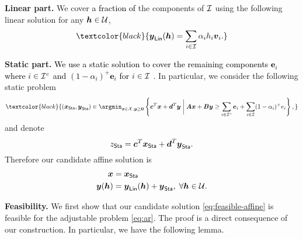 \documentclass[moor]{informs1}              %
\newcommand{\mb}[1]{\ensuremath{\boldsymbol{#1}}}
\newcommand*{\red}{\textcolor{black}}
\begin{document}
\vspace{2mm}
\noindent
{\bf Linear part.} We cover \red{a fraction of }the components of ${\cal I}$ using the following linear solution for any $ \mb h \in {\cal U}$,
\begin{equation} \label{eq:linear-sol}
 \red{\mb y_{\sf Lin}( \mb h )   = \sum_{i \in {\cal I} }  \alpha_i  h_i {\mb v}_i .}
\end{equation}

\vspace{2mm}
\noindent
{\bf Static part.}   \red{We use a static solution to cover the remaining components $\mb e_i$ where $ i \in {\cal I}^c$ and $(1-\alpha_i)^+ \mb e_i$ for $ i \in {\cal I}$ }. In particular, we consider the following static problem
\begin{equation} \label{eq:static}
\red{ (\mb x_{\sf Sta}, \mb y_{\sf Sta}) \in \argmin_{\mb x \in {\cal X}, \mb y \geq \mb 0} \left\{ \mb c^T \mb x+ \mb d^T \mb y \; \bigg\vert \;  \mb A \mb x+ \mb B \mb y \geq \sum_{ i \in {\cal I}^c} \mb e_i     + \sum_{ i \in {\cal I}}  (1-\alpha_i)^+ e_i \right\},}
\end{equation}
and  denote  $$z_{\sf Sta}=\mb c^T \mb x_{\sf Sta}+ \mb d^T \mb y_{\sf Sta}.$$ Therefore our candidate affine solution is
\begin{equation}\label{eq:feasible-affine}
\begin{aligned}
 \mb x  & =\mb x_{\sf Sta}  \\
 \mb y ( \mb h ) &   =  \mb y_{\sf Lin}( \mb h ) +  \mb  y_{\sf Sta}, \; \forall \mb h \in{\cal U}. \\
\end{aligned}
\end{equation}

\vspace{2mm}
\noindent
{\bf Feasibility.} We first show that  our candidate solution \eqref{eq:feasible-affine} is feasible for the adjustable problem \eqref{eq:ar}. The proof is a direct consequence of our construction. In particular, we have the following lemma.
\end{document}
